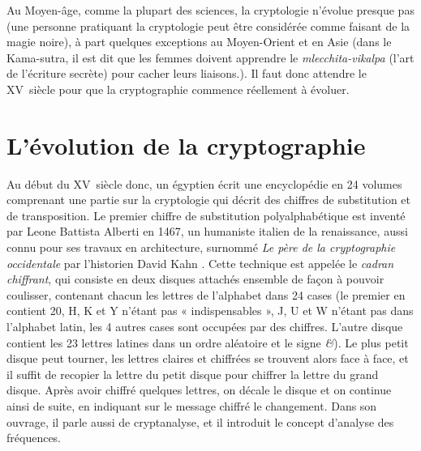 Au Moyen-âge, comme la plupart des sciences, la cryptologie n'évolue
presque pas (une personne pratiquant la cryptologie peut être
considérée comme faisant de la magie noire), à part quelques exceptions
au Moyen-Orient et en Asie (dans le Kama-sutra, il est dit que les
femmes doivent apprendre le \emph{mlecchita-vikalpa} (l'art de
l'écriture secrète) pour cacher leurs liaisons.). Il faut donc
attendre le XV\ieme~siècle pour que la cryptographie commence
réellement à évoluer. \\

\section{L'évolution de la cryptographie}
Au début du XV\ieme~siècle donc, un égyptien écrit une encyclopédie
en 24 volumes comprenant une partie sur la cryptologie qui décrit des
chiffres de substitution et de transposition. Le premier chiffre de
substitution polyalphabétique
est inventé par Leone Battista Alberti en 1467, un humaniste italien
de la renaissance, aussi connu pour ses travaux en architecture,
surnommé \emph{Le père de la cryptographie occidentale} par
l'historien David Kahn \cite{Codebreakers}. Cette technique est appelée
le \emph{cadran chiffrant}\label{syst:CadranChiffrant}, qui consiste
en deux disques attachés ensemble de façon à pouvoir coulisser,
contenant chacun les lettres de l'alphabet dans 24 cases (le premier
en contient 20, H, K et Y n'étant pas « indispensables », J, U et W
n'étant pas dans l'alphabet latin, les 4 autres cases sont occupées
par des chiffres. L'autre disque contient les 23 lettres latines dans
un ordre aléatoire et le signe \emph{\&}). Le plus petit disque peut tourner,
les lettres claires et chiffrées se trouvent alors face à face, et il
suffit de recopier la lettre du petit disque pour chiffrer la lettre
du grand disque. Après avoir chiffré quelques lettres, on décale le
disque et on continue ainsi de suite, en indiquant sur le message
chiffré le changement. Dans son ouvrage, il parle aussi de
cryptanalyse, et il introduit le concept d'analyse des
fréquences. \\

